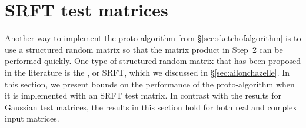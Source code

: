 \documentclass[final]{siamltex}
\newcounter{algorithm}[section]
\newcommand{\notate}[1]{\textcolor{red}{\textbf{[#1]}}}
\begin{document}
%
%
%
%
%
%
%
%

\section{SRFT test matrices}
\label{sec:SRFTs}

Another way to implement the proto-algorithm from \S\ref{sec:sketchofalgorithm}
is to use a structured random matrix so that the matrix product in Step~2
can be performed quickly.  One type of structured random matrix that has
been proposed in the literature is the ,
or SRFT, which we discussed in \S\ref{sec:ailonchazelle}.
In this section, we present bounds on the performance of the
proto-algorithm when it is implemented with an SRFT test matrix.
In contrast with the results
for Gaussian test matrices, the results in this section hold for both
real and complex input matrices.
\end{document}
